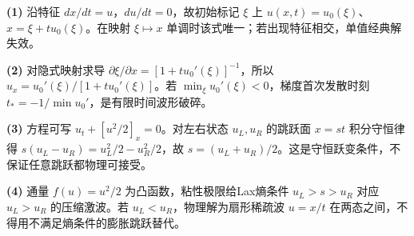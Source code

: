 \par\noindent\textbf{(1)} 沿特征 \(dx/dt=u\)，\(du/dt=0\)，故初始标记 \(\xi\) 上 \(u(x,t)=u_0(\xi)\)、\(x=\xi+t u_0(\xi)\)。在映射 \(\xi\mapsto x\) 单调时该式唯一；若出现特征相交，单值经典解失效。
\par\noindent\textbf{(2)} 对隐式映射求导 \(\partial\xi/\partial x=[1+t u_0'(\xi)]^{-1}\)，所以 \(u_x=u_0'(\xi)/[1+t u_0'(\xi)]\)。若 \(\min_\xi u_0'(\xi)<0\)，梯度首次发散时刻 \(t_*=-1/\min u_0'\)，是有限时间波形破碎。
\par\noindent\textbf{(3)} 方程可写 \(u_t+[u^2/2]_x=0\)。对左右状态 \(u_L,u_R\) 的跳跃面 \(x=s t\) 积分守恒律得 \(s(u_L-u_R)=u_L^2/2-u_R^2/2\)，故 \(s=(u_L+u_R)/2\)。这是守恒跃变条件，不保证任意跳跃都物理可接受。
\par\noindent\textbf{(4)} 通量 \(f(u)=u^2/2\) 为凸函数，粘性极限给Lax熵条件 \(u_L>s>u_R\) 对应 \(u_L>u_R\) 的压缩激波。若 \(u_L<u_R\)，物理解为扇形稀疏波 \(u=x/t\) 在两态之间，不得用不满足熵条件的膨胀跳跃替代。

